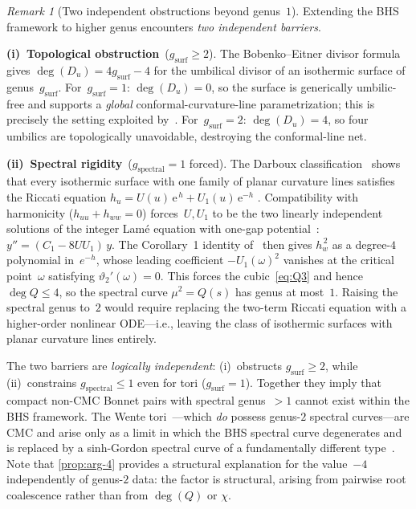 \documentclass[11pt,a4paper]{article}
\theoremstyle{plain}
\theoremstyle{definition}
\theoremstyle{remark}
\newtheorem{remark}[theorem]{Remark}
\newcommand{\ee}{\mathrm{e}}
\begin{document}
\begin{remark}[Two independent obstructions beyond genus~$1$]
\label{rem:umbilical-obstruction}
Extending the BHS framework to higher genus encounters
\emph{two independent barriers}.

\noindent\textbf{(i)~Topological obstruction}~($g_{\mathrm{surf}} \geq 2$).
The Bobenko--Eitner divisor formula~\cite{BE00} gives
$\deg(D_u) = 4g_{\mathrm{surf}} - 4$ for the umbilical divisor
of an isothermic surface of genus~$g_{\mathrm{surf}}$.
For~$g_{\mathrm{surf}} = 1$: $\deg(D_u) = 0$, so the surface is
generically umbilic-free and supports a \emph{global}
conformal-curvature-line parametrization; this is precisely the
setting exploited by~\cite{BHS25,BHS-comp}.
For~$g_{\mathrm{surf}} = 2$: $\deg(D_u) = 4$, so four umbilics are
topologically unavoidable, destroying the conformal-line net.

\noindent\textbf{(ii)~Spectral rigidity}~($g_{\mathrm{spectral}} = 1$ forced).
The Darboux classification~\cite{Dar83} shows that every
isothermic surface with one family of planar curvature lines
satisfies the Riccati equation
$h_u = U(u)\,\ee^{\,h} + U_1(u)\,\ee^{-h}$
\cite[Theorem~1]{BHS-comp}.  Compatibility with harmonicity
($h_{uu} + h_{ww} = 0$) forces~$U,U_1$ to be
the two linearly independent solutions of the integer Lam\'{e}
equation with one-gap potential~\cite[Lemma~1]{BHS-comp}:
$y'' = (C_1 - 8 U U_1)\,y.$
The Corollary~1 identity of~\cite{BHS-comp} then gives
$h_w^{\,2}$ as a degree-$4$ polynomial in~$e^{-h}$, whose leading
coefficient $-U_1(\omega)^2$ vanishes at the critical
point~$\omega$ satisfying $\vartheta_2'(\omega) = 0$.
This forces the cubic~\eqref{eq:Q3}
and hence $\deg Q \leq 4$, so the spectral curve
$\mu^2 = Q(s)$ has genus at most~$1$.
Raising the spectral genus to~$2$ would require replacing the
two-term Riccati equation with a higher-order nonlinear ODE---i.e.,
leaving the class of isothermic surfaces with planar curvature
lines entirely.

\medskip
The two barriers are \emph{logically independent}: (i)~obstructs
$g_{\mathrm{surf}} \geq 2$, while (ii)~constrains
$g_{\mathrm{spectral}} \leq 1$ even for tori
($g_{\mathrm{surf}} = 1$).  Together they imply that compact
non-CMC Bonnet pairs with spectral genus~$>1$ cannot exist
within the BHS framework.  The Wente tori~\cite{Wen86}---which \emph{do}
possess genus-$2$ spectral curves---are CMC and arise only as a
limit in which the BHS spectral curve degenerates and is replaced
by a sinh-Gordon spectral curve of a fundamentally different
type~\cite{CKKS21}.
%
Note that \cref{prop:arg-4} provides a structural explanation
for the value~$-4$
independently of genus-$2$ data: the factor is structural,
arising from pairwise root coalescence rather than from
$\deg(Q)$ or $\chi$.
\end{remark}
\end{document}
